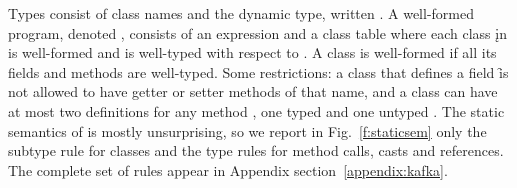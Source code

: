 \documentclass[acmlarge, anonymous, authordraft]{acmart}
\begin{document}





Types consist of class names and the dynamic type, written
\any.  A well-formed program, denoted \WFp\e\K, consists of an expression \e and a
class table \K where each class \k in \K is well-formed and \e is well-typed
with respect to \K.  A class is well-formed if all its fields and methods
are well-typed. Some restrictions: a class that defines a field \f is not allowed to have
getter or setter methods of that name, and a class can have at most two
definitions for any method \m, one typed \Mdef\m\x\C\D\e and one untyped
\Mdef\m\x\any\any\e.  The static semantics of \kafka is mostly unsurprising,
so we report in Fig.~\ref{f:staticsem} only the subtype rule for classes and the type rules for method calls, casts and references.
The complete
set of rules appear in Appendix section~\ref{appendix:kafka}.  
\end{document}
